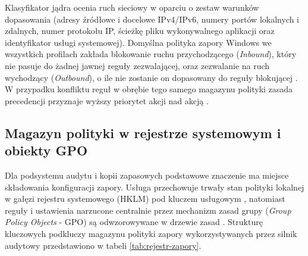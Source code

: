 Klasyfikator jądra ocenia ruch sieciowy w oparciu o zestaw warunków dopasowania (adresy źródłowe i docelowe IPv4/IPv6, numery portów lokalnych i zdalnych, numer protokołu IP, ścieżkę pliku wykonywalnego aplikacji oraz identyfikator usługi systemowej). Domyślna polityka zapory Windows we wszystkich profilach zakłada blokowanie ruchu przychodzącego (\textit{Inbound}), który nie pasuje do żadnej jawnej reguły zezwalającej, oraz zezwalanie na ruch wychodzący (\textit{Outbound}), o ile nie zostanie on dopasowany do reguły blokującej \cite{ms-defender-firewall}. W przypadku konfliktu reguł w obrębie tego samego magazynu polityki zasada precedencji przyznaje wyższy priorytet akcji  nad akcją .

\subsection{Magazyn polityki w rejestrze systemowym i obiekty GPO}\label{subsec:struktura-regul}

Dla podsystemu audytu i kopii zapasowych podstawowe znaczenie ma miejsce składowania konfiguracji zapory. Usługa  przechowuje trwały stan polityki lokalnej w gałęzi rejestru systemowego  (HKLM) pod kluczem usługowym , natomiast reguły i ustawienia narzucone centralnie przez mechanizm zasad grupy (\textit{Group Policy Objects} - GPO) są odwzorowywane w drzewie zasad . Strukturę kluczowych podkluczy magazynu polityki zapory wykorzystywanych przez silnik audytowy przedstawiono w tabeli \ref{tab:rejestr-zapory}.


